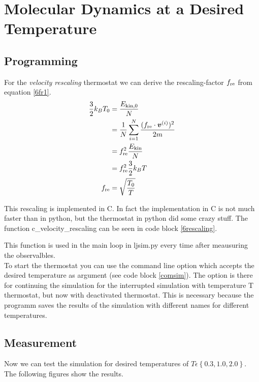 \section{Molecular Dynamics at a Desired Temperature}

\subsection*{Programming}

For the \emph{velocity rescaling} thermostat we can derive the rescaling-factor $f_\text{re}$ from equation \eqref{6fr1}.
\begin{align}
\frac{3}{2}k_BT_0
	&= \frac{E_{\text{kin},0}}{N}
	\label{6fr1}\\
&= \frac{1}{N}\sum_{i=1}^{N} \frac{(f_\text{re}\cdot\boldsymbol{v}^{(i)})^2}{2m}
	\label{6fr2}\\
&= f_\text{re}^2\frac{E_\text{kin}}{N}
	\label{6fr3}\\
&=f_\text{re}^2\frac{3}{2}k_BT
	\label{6fr4}\\
f_\text{re}
	&= \sqrt{\frac{T_0}{T}}
	\label{6r5}
\end{align}

This rescaling is implemented in C. In fact the implementation in C is not much faster than in python, but the thermostat in python did some crazy stuff.
The function c\_velocity\_rescaling can be seen in code block \ref{6rescaling}.


This function is used in the main loop in ljsim.py every time after meausuring the observalbles.\\

To start the thermostat you can use the command line option  which accepts the desired temperature as argument (see code block \ref{comsim}).
The option  is there for continuing the simulation for the interrupted simulation with temperature T thermostat, but now with deactivated thermostat.
This is necessary because the programm saves the results of the simulation with different names for different temperatures.

\subsection*{Measurement}

Now we can test the simulation for desired temperatures of  $T\epsilon\left\lbrace 0.3,1.0,2.0\right\rbrace $. The following figures show the results.

